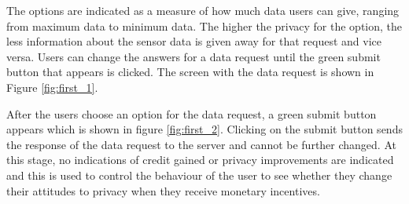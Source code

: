 The options are indicated as a measure of how much data users can give, ranging from maximum data to minimum data. The higher the privacy for the option, the less information about the sensor data is given away for that request and vice versa. Users can change the answers for a data request until the green submit button that appears is clicked. The screen with the data request is shown in Figure \ref{fig:first_1}. 

After the users choose an option for the data request, a green submit button appears which is shown in figure \ref{fig:first_2}. Clicking on the submit button sends the response of the data request to the server and cannot be further changed. At this stage, no indications of credit gained or privacy improvements are indicated and this is used to control the behaviour of the user to see whether they change their attitudes to privacy when they receive monetary incentives.

